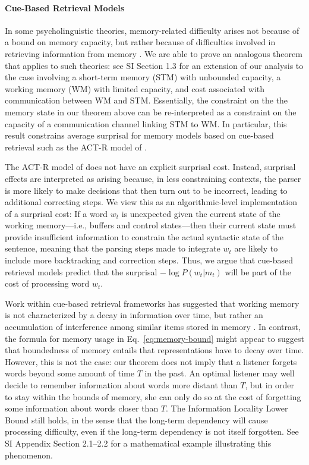 \paragraph{Cue-Based Retrieval Models}

In some psycholinguistic theories, memory-related difficulty arises not because of a bound on memory capacity, but rather because of difficulties involved in retrieving information from memory \citep{mcelree2000sentence,lewis-activation-based-2005,nicenboim2018models,vasishth2019computational}. We are able to prove an analogous theorem that applies to such theories: see SI Section 1.3 for an extension of our analysis to the case involving a short-term memory (STM) with unbounded capacity, a working memory (WM) with limited capacity, and cost associated with communication between WM and STM. Essentially, the constraint on the the memory state in our theorem above can be re-interpreted as a constraint on the capacity of a communication channel linking STM to WM. In particular, this result constrains average surprisal for memory models based on cue-based retrieval such as the ACT-R model of \citet{lewis-activation-based-2005}.

The ACT-R model of \cite{lewis-activation-based-2005} does not have an explicit surprisal cost.
Instead, surprisal effects are interpreted as arising because, in less constraining contexts, the parser is more likely to make decisions that then turn out to be incorrect, leading to additional correcting steps.
We view this as an algorithmic-level implementation of a surprisal cost:
If a word $w_t$ is unexpected given the current state of the working memory---i.e., buffers and control states---then their current state must provide insufficient information to constrain the actual syntactic state of the sentence, meaning that the parsing steps made to integrate $w_t$ are likely to include more backtracking and correction steps.
Thus, we argue that cue-based retrieval models predict that the surprisal $- \log P(w_t|m_t)$ will be part of the cost of processing word $w_t$.

Work within cue-based retrieval frameworks has suggested that working memory is not characterized by a decay in information over time, but rather an accumulation of interference among similar items stored in memory \citep[][p. 408]{lewis-activation-based-2005}.
In contrast, the formula for memory usage in Eq.~\ref{eq:memory-bound} might appear to suggest that boundedness of memory entails that representations have to decay over time.
However, this is not the case:
our theorem does not imply that a listener forgets words beyond some amount of time $T$ in the past. 
An optimal listener may well decide to remember information about words more distant than $T$, but in order to stay within the bounds of memory, she can only do so at the cost of forgetting some information about words closer than $T$.
The Information Locality Lower Bound still holds, in the sense that the long-term dependency will cause processing difficulty, even if the long-term dependency is not itself forgotten.
See SI Appendix Section 2.1--2.2 for a mathematical example illustrating this phenomenon.

